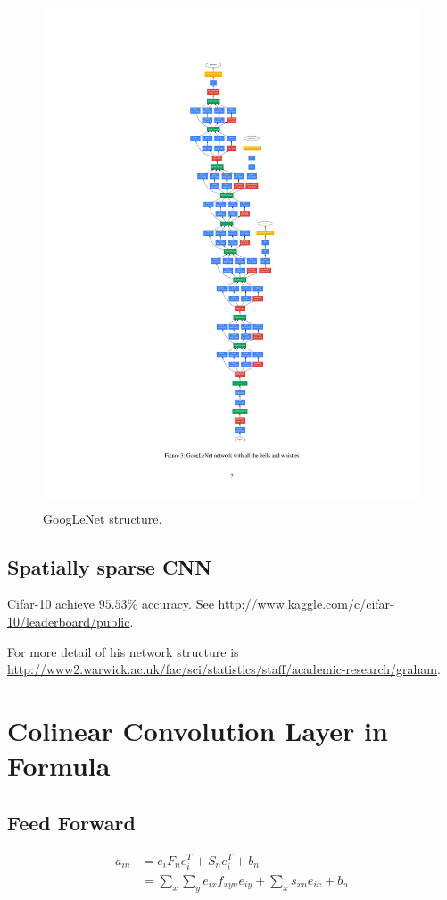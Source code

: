 \documentclass[12pt]{article}
\begin{document}
    \begin{figure}[!ht]
        \centering
        \includegraphics[height=15cm]{GoogLeNetStructure.pdf}
        \caption{\label{fig:googlenet} GoogLeNet structure. }
    \end{figure}

    \subsection{Spatially sparse CNN}
    Cifar-10 achieve $95.53\%$ accuracy. See \url{http://www.kaggle.com/c/cifar-10/leaderboard/public}.

    For more detail of his network structure is \url{http://www2.warwick.ac.uk/fac/sci/statistics/staff/academic-research/graham}.

\section{Colinear Convolution Layer in Formula}
    \subsection{Feed Forward}
    \begin{equation}
    \begin{split}
    a_{in} &= e_iF_ne_i^T + S_ne_i^T + b_n \\
    &= \sum_x \sum_y e_{ix}f_{xyn}e_{iy} + \sum_x s_{xn}e_{ix} + b_n
    \end{split}
    \end{equation}
\end{document}
